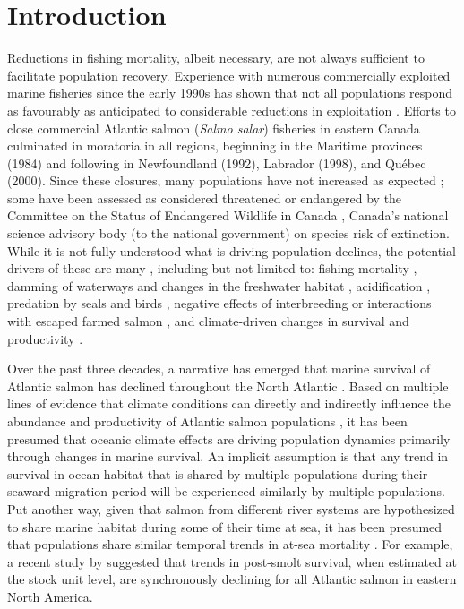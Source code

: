 \documentclass[12pt]{article}
\begin{document}

\section*{Introduction} %


Reductions in fishing mortality, albeit necessary, are not always sufficient
to facilitate population recovery. Experience with numerous commercially
exploited marine fisheries since the early 1990s has shown that not all
populations respond as favourably as anticipated to considerable reductions in
exploitation \citep{Hutchings2017}. Efforts to close commercial
Atlantic salmon (\emph{Salmo salar}) fisheries in eastern Canada culminated in
moratoria in all regions, beginning in the Maritime provinces (1984) and
following in Newfoundland (1992), Labrador (1998), and Qu\'{e}bec (2000). Since
these closures, many populations have not increased as 
expected \citep{Dempson2004, ICES2019}; some 
have been assessed as considered threatened or endangered by the 
Committee on the Status of Endangered Wildlife in Canada \citep[COSEWIC, ][]{Cosewic2010}, 
Canada's national science advisory body (to the national government) on
species risk of extinction.
While it is not fully understood what is driving population declines, the potential
drivers of these are many \citep[see ][for a detailed discussion of possible
causes]{Cairns2001}, including but not limited to: fishing mortality \citep{Dempson2004}, 
damming of waterways and changes in the freshwater habitat \citep{Dunfield1985}, acidification
\citep[particularly in the Southern Uplands region of
NS, see][]{Gibson2010}, predation by seals and birds \citep{Cairns2000}, negative
effects of interbreeding or interactions with escaped farmed salmon
\citep{Keyser2018}, and climate-driven changes in survival and productivity \citep{Mills2013}.

Over the past three decades, a narrative has emerged that marine survival of
Atlantic salmon has declined throughout the North Atlantic \citep{ICES2019}.
Based on multiple lines of evidence that climate conditions can directly and
indirectly influence the abundance and productivity of Atlantic salmon
populations \citep{Mills2013,Almodovar2019}, it has been presumed that oceanic climate effects are
driving population dynamics primarily through changes in marine survival.
An implicit assumption is that any trend in
survival in ocean habitat that is shared by multiple populations during their
seaward migration period will be experienced similarly by multiple
populations. Put another way, given that salmon from different river systems
are hypothesized to share marine habitat during some of their time at sea, it
has been presumed that populations share similar temporal trends in
at-sea mortality \citep{Friedland1993, Friedland1998, Russell2012}.  
For example, a recent study by \citet{Olmos2019} suggested that trends in post-smolt
survival, when estimated at the stock unit level, are synchronously declining
for all Atlantic salmon in eastern North America.
\end{document}
